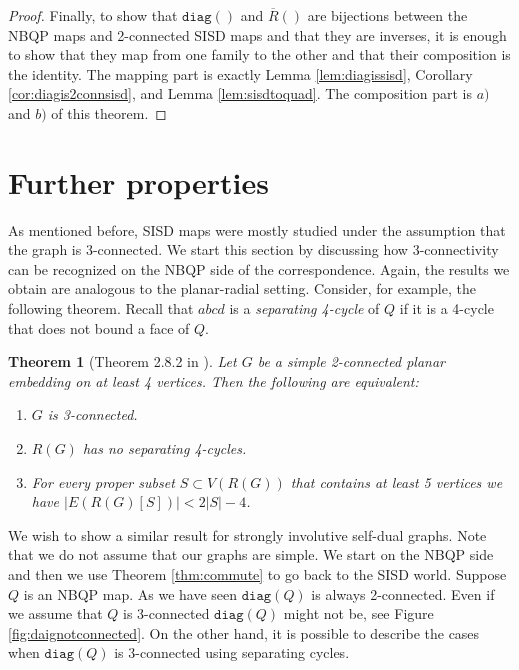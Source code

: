 \documentclass{article}
\newtheorem{theorem}{Theorem}[section]
\newcommand{\diag}[0]{\mathtt{diag}}
\begin{document}
\begin{proof}
 Finally, to show that $\diag()$ and $\overline{R}()$ are bijections between the NBQP maps and 2-connected SISD maps and that they are inverses, it is enough to show that they map from one family to the other and that their composition is the identity. The mapping part is exactly  Lemma \ref{lem:diagissisd}, Corollary \ref{cor:diagis2connsisd}, and Lemma \ref{lem:sisdtoquad}. The composition part is $a)$ and $b)$ of this theorem.
    

    
\end{proof}


\section{Further properties}\label{sec:applications}
As mentioned before, SISD maps were mostly studied under the assumption that the graph is 3-connected. We start this section by discussing how 3-connectivity can be recognized on the NBQP side of the correspondence. Again, the results we obtain are analogous to the planar-radial setting. Consider, for example, the following theorem. Recall that $abcd$ is a \emph{separating 4-cycle} of $Q$ if it is a 4-cycle that does not bound a face of $Q$. 

\begin{theorem}[Theorem 2.8.2 in \cite{mohar2001graphs}]\label{thm:radial3con}
    Let $G$ be a simple 2-connected planar embedding on at least 4 vertices. Then the following are equivalent:
    \begin{enumerate}
        \item $G$ is 3-connected. 
        \item $R(G)$ has no separating 4-cycles.
        \item For every proper subset $S\subset V(R(G))$ that contains at least 5 vertices we have $|E(R(G)[S])|<2|S|- 4$.
    \end{enumerate}
\end{theorem}

We wish to show a similar result for strongly involutive self-dual graphs. Note that we do not assume that our graphs are simple. We start on the NBQP side and then we use Theorem \ref{thm:commute} to go back to the SISD world. Suppose $Q$ is an NBQP map. As we have seen $\diag(Q)$ is always 2-connected. Even if we assume that $Q$ is 3-connected $\diag(Q)$ might not be, see Figure \ref{fig:daignotconnected}. On the other hand, it is possible to describe the cases when $\diag(Q)$ is 3-connected using separating cycles. 
\end{document}
